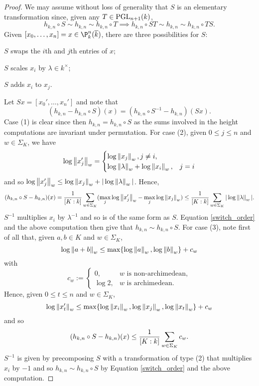 \documentclass[11pt]{article}
\begin{document}
\begin{proof}
We may assume without loss of generality that $S$ is an elementary transformation since, given any $T\in\textup{PGL}_{n+1}(k)$,
$$h_{k,n}\circ S\sim h_{k,n}\sim h_{k,n}\circ T\implies h_{k,n}\circ ST\sim h_{k,n}\sim h_{k,n}\circ TS.$$ 
Given $[x_0,\ldots,x_n]=x\in\P_k^n(\ov{k})$, there are three possibilities for $S$:
\begin{enum}{\arabic}
\item $S$ swaps the $i$th and $j$th entries of $x$;
\item $S$ scales $x_i$ by $\lambda\in k^{\times}$;
\item $S$ adds $x_i$ to $x_j$.
\end{enum}
Let $Sx=[x_0',\ldots,x_n']$ and note that 
\begin{equation}\label{switch_order}
(h_{k,n}-h_{k,n}\circ S)(x)=(h_{k,n}\circ S^{-1}-h_{k,n})(Sx).
\end{equation}
Case (1) is clear since then $h_{k,n}=h_{k,n}\circ S$ as the sums involved in the height computations are invariant under permutation. For case (2), given $0\leq j\leq n$ and $w\in\Sigma_K$, we have 
\begin{equation*}
\log\left\lVert x_j'\right\rVert_w=
\begin{cases}
\log\left\lVert x_j\right\rVert_w, j\neq i, \\
\log\left\lVert\lambda\right\rVert_w+\log\left\lVert x_i\right\rVert_w, & j=i
\end{cases}
\end{equation*}
and so $\log\left\lVert x_j'\right\rVert_w\leq\log\left\lVert x_j\right\rVert_w+|\log\left\lVert\lambda\right\rVert_w|$. Hence, 
$$(h_{k,n}\circ S-h_{k,n})(x)
=\dfrac{1}{[K:k]}\sum_{w\in\Sigma_K}(\max_j\log\left\lVert x_j'\right\rVert_w-\max_j\log\left\lVert x_j\right\rVert_w)
\leq\dfrac{1}{[K:k]}\sum_{w\in\Sigma_K}|\log\left\lVert\lambda\right\rVert_w|.$$
$S^{-1}$ multiplies $x_i$ by $\lambda^{-1}$ and so is of the same form as $S$. Equation \eqref{switch_order} and the above computation then give that $h_{k,n}\sim h_{k,n}\circ S$. For case (3), note first of all that, given $a,b\in K$ and $w\in\Sigma_K$, 
$$\log\left\lVert a+b\right\rVert_w\leq\max\{\log\left\lVert a\right\rVert_w,\log\left\lVert b\right\rVert_w\}+c_w$$ 
with 
\begin{equation*}
c_w:=
\begin{cases}
0, & w\textrm{ is non-archimedean}, \\
\log2, & w\textrm{ is archimedean}.
\end{cases}
\end{equation*}
Hence, given $0\leq t\leq n$ and $w\in\Sigma_K$, 
$$\log\left\lVert x_t'\right\rVert_w\leq\max\{\log\left\lVert x_i\right\rVert_w,\log\left\lVert x_j\right\rVert_w,\log\left\lVert x_t\right\rVert_w\}+c_w$$ 
and so 
$$(h_{k,n}\circ S-h_{k,n})(x)\leq\dfrac{1}{[K:k]}\sum_{w\in\Sigma_K}c_w.$$ 
$S^{-1}$ is given by precomposing $S$ with a transformation of type (2) that multiplies $x_i$ by $-1$ and so $h_{k,n}\sim h_{k,n}\circ S$ by Equation \eqref{switch_order} and the above computation.
\end{proof}
\end{document}
